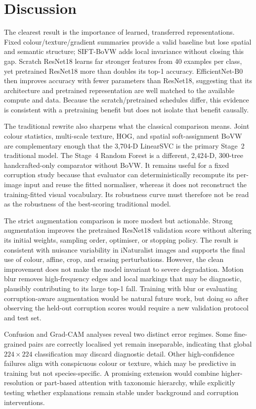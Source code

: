 \section{Discussion}
\label{sec:discussion}

The clearest result is the importance of learned, transferred
representations.  Fixed colour/texture/gradient summaries provide a valid
baseline but lose spatial and semantic structure; SIFT-BoVW adds local
invariance without closing this gap.  Scratch ResNet18 learns far stronger
features from 40 examples per class, yet pretrained ResNet18 more than doubles
its top-1 accuracy.  EfficientNet-B0 then improves accuracy with fewer
parameters than ResNet18, suggesting that its architecture and pretrained
representation are well matched to the available compute and data.  Because
the scratch/pretrained schedules differ, this evidence is consistent with a
pretraining benefit but does not isolate that benefit causally.

The traditional rewrite also sharpens what the classical comparison means.
Joint colour statistics, multi-scale texture, HOG, and spatial soft-assignment
BoVW are complementary enough that the 3,704-D LinearSVC is the primary
Stage~2 traditional model.  The Stage~4 Random Forest is a different,
2,424-D, 300-tree handcrafted-only comparator without BoVW.  It remains useful
for a fixed corruption study because that evaluator can deterministically
recompute its per-image input and reuse the fitted normaliser, whereas it does
not reconstruct the training-fitted visual vocabulary.  Its robustness curve
must therefore not be read as the robustness of the best-scoring traditional
model.

The strict augmentation comparison is more modest but actionable.  Strong
augmentation improves the pretrained ResNet18 validation score without
altering its initial weights, sampling order, optimiser, or stopping policy.
The result is consistent with nuisance variability in iNaturalist images and
supports the final use of colour, affine, crop, and erasing perturbations.
However, the clean improvement does not make the model invariant to severe
degradation.  Motion blur removes high-frequency edges and local markings that
may be diagnostic, plausibly contributing to its large top-1 fall.  Training
with blur or evaluating corruption-aware
augmentation would be natural future work, but doing so after observing the
held-out corruption scores would require a new validation protocol and test
set.

Confusion and Grad-CAM analyses reveal two distinct error regimes.  Some
fine-grained pairs are correctly localised yet remain inseparable, indicating
that global $224\!\times\!224$ classification may discard diagnostic detail.
Other high-confidence failures align with conspicuous colour or texture, which
may be predictive in training but not species-specific.  A promising extension
would combine higher-resolution or part-based attention with taxonomic
hierarchy, while explicitly testing whether explanations remain stable under
background and corruption interventions.

